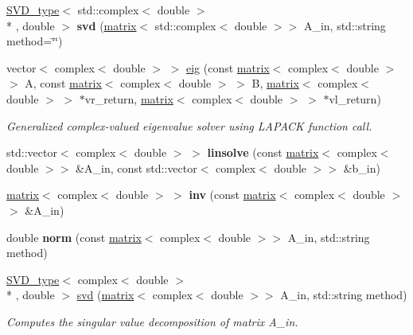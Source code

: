 \begin{DoxyCompactItemize}
\item 
\hypertarget{namespacekeycpp_aa6d15c3c38ff98e6d9afdd9db4b46c6c}{\hyperlink{structkeycpp_1_1_s_v_d__type}{S\-V\-D\-\_\-type}$<$ std\-::complex$<$ double $>$\\*
, double $>$ {\bfseries svd} (\hyperlink{classkeycpp_1_1matrix}{matrix}$<$ std\-::complex$<$ double $>$$>$ A\-\_\-in, std\-::string method=\char`\"{}\char`\"{})}\label{namespacekeycpp_aa6d15c3c38ff98e6d9afdd9db4b46c6c}

\item 
vector$<$ complex$<$ double $>$ $>$ \hyperlink{namespacekeycpp_a190640edb8e634de02d302d94a29ee17}{eig} (const \hyperlink{classkeycpp_1_1matrix}{matrix}$<$ complex$<$ double $>$ $>$ A, const \hyperlink{classkeycpp_1_1matrix}{matrix}$<$ complex$<$ double $>$ $>$ B, \hyperlink{classkeycpp_1_1matrix}{matrix}$<$ complex$<$ double $>$ $>$ $\ast$vr\-\_\-return, \hyperlink{classkeycpp_1_1matrix}{matrix}$<$ complex$<$ double $>$ $>$ $\ast$vl\-\_\-return)
\begin{DoxyCompactList}\small\item\em Generalized complex-\/valued eigenvalue solver using L\-A\-P\-A\-C\-K function call. \end{DoxyCompactList}\item 
\hypertarget{namespacekeycpp_acea0bb8f128ef0cdf55a79c50ceccb83}{std\-::vector$<$ complex$<$ double $>$ $>$ {\bfseries linsolve} (const \hyperlink{classkeycpp_1_1matrix}{matrix}$<$ complex$<$ double $>$$>$ \&A\-\_\-in, const std\-::vector$<$ complex$<$ double $>$$>$ \&b\-\_\-in)}\label{namespacekeycpp_acea0bb8f128ef0cdf55a79c50ceccb83}

\item 
\hypertarget{namespacekeycpp_ac9cabca49e9650ae8b5aadf5ee2f7f4e}{\hyperlink{classkeycpp_1_1matrix}{matrix}$<$ complex$<$ double $>$ $>$ {\bfseries inv} (const \hyperlink{classkeycpp_1_1matrix}{matrix}$<$ complex$<$ double $>$$>$ \&A\-\_\-in)}\label{namespacekeycpp_ac9cabca49e9650ae8b5aadf5ee2f7f4e}

\item 
\hypertarget{namespacekeycpp_af1a41d0919918b5cf62ef28dd68217d1}{double {\bfseries norm} (const \hyperlink{classkeycpp_1_1matrix}{matrix}$<$ complex$<$ double $>$$>$ A\-\_\-in, std\-::string method)}\label{namespacekeycpp_af1a41d0919918b5cf62ef28dd68217d1}

\item 
\hypertarget{namespacekeycpp_a913fb7501259de640e7119a852adafc9}{\hyperlink{structkeycpp_1_1_s_v_d__type}{S\-V\-D\-\_\-type}$<$ complex$<$ double $>$\\*
, double $>$ \hyperlink{namespacekeycpp_a913fb7501259de640e7119a852adafc9}{svd} (\hyperlink{classkeycpp_1_1matrix}{matrix}$<$ complex$<$ double $>$$>$ A\-\_\-in, std\-::string method)}\label{namespacekeycpp_a913fb7501259de640e7119a852adafc9}

\begin{DoxyCompactList}\small\item\em Computes the singular value decomposition of matrix A\-\_\-in. \end{DoxyCompactList}\end{DoxyCompactItemize}



